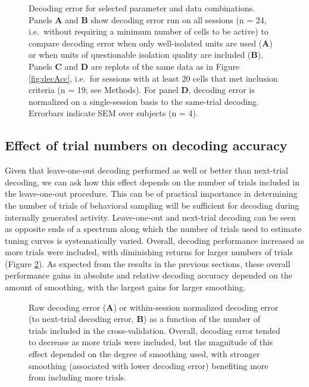 \documentclass[11pt]{article}
\newcommand{\bsf}[1]{\textbf{#1}}
\begin{document}
\begin{figure}[h]
  \centering
   \caption{Decoding error for selected parameter and data
    combinations. Panels \bsf{A} and \bsf{B} show decoding error run
    on all sessions (n = 24, i.e.\ without requiring a minimum number
    of cells to be active) to compare decoding error when only
    well-isolated units are used (\bsf{A}) or when units of
    questionable isolation quality are included (\bsf{B}). Panels
    \bsf{C} and \bsf{D} are replots of the same data as in Figure
    \ref{fig:decAcc}, i.e.\ for sessions with at least 20 cells that
    met inclusion criteria (n = 19; see Methods). For panel \bsf{D},
    decoding error is normalized on a single-session basis to the
    same-trial decoding. Errorbars indicate SEM over subjects (n =
    4).}
  \label{fig:decAcc2}
\end{figure}

\subsection*{Effect of trial numbers on decoding accuracy}

Given that leave-one-out decoding performed as well or better than
next-trial decoding, we can ask how this effect depends on the number
of trials included in the leave-one-out procedure. This can be of
practical importance in determining the number of trials of behavioral
sampling will be sufficient for decoding during internally generated
activity. Leave-one-out and next-trial decoding can be seen as
opposite ends of a spectrum along which the number of trials used to
estimate tuning curves is systematically varied. Overall, decoding
performance increased as more trials were included, with diminishing
returns for larger numbers of trials (Figure
\ref{fig:decAccByLap}). As expected from the results in the previous
sections, these overall performance gains in absolute and relative
decoding accuracy depended on the amount of smoothing, with the
largest gains for larger smoothing.

\begin{figure}[h]
  \centering
  \caption{Raw decoding error (\bsf{A}) or within-session normalized
    decoding error (to next-trial decoding error, \bsf{B}) as a
    function of the number of trials included in the
    cross-validation. Overall, decoding error tended to decrease as
    more trials were included, but the magnitude of this effect
    depended on the degree of smoothing used, with stronger smoothing
    (associated with lower decoding error) benefiting more from
    including more trials.}
  \label{fig:decAccByLap}
\end{figure}
\end{document}
